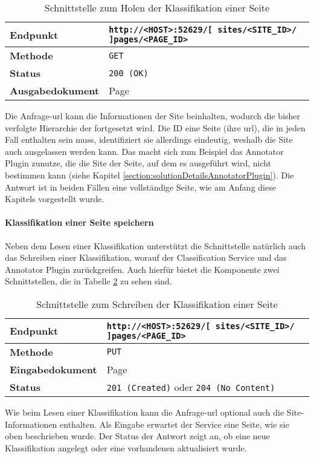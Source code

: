     \begin{table}[htb]
        \centering
        \begin{tabular}{|l|l|}
        \hline
        \textbf{Endpunkt} & \texttt{http://<HOST>:52629/[ sites/<SITE\_ID>/ ]pages/<PAGE\_ID>}\\
        \hline
        \textbf{Methode} & \texttt{GET}\\
        \hline
        \textbf{Status} & \texttt{200 (OK)}\\
        \hline
        \textbf{Ausgabedokument} & Page\\
        \hline
        \end{tabular}
        \caption{Schnittstelle zum Holen der Klassifikation einer Seite}
        \label{table:getFullPageInterface}
    \end{table}

    Die Anfrage-\gls{url} kann die Informationen der Site beinhalten,
    wodurch die bisher verfolgte Hierarchie der {\resources} fortgesetzt wird.
    Die ID eine Seite (ihre \gls{url}), die in jeden Fall enthalten sein muss, identifiziert sie allerdings eindeutig,
    weshalb die Site auch ausgelassen werden kann.
    Das macht sich zum Beispiel das Annotator Plugin zunutze,
    die die Site der Seite, auf dem es ausgeführt wird, nicht bestimmen kann
    (siehe Kapitel \ref{section:solutionDetailsAnnotatorPlugin}).
    Die Antwort ist in beiden Fällen eine vollständige Seite,
    wie am Anfang diese Kapitels vorgestellt wurde.

    \paragraph{Klassifikation einer Seite speichern}
    Neben dem Lesen einer Klassifikation unterstützt die Schnittstelle natürlich auch das Schreiben einer Klassifikation,
    worauf der Classification Service und das Annotator Plugin zurückgreifen.
    Auch hierfür bietet die Komponente zwei Schnittstellen, die in Tabelle \ref{table:writePageInterface} zu sehen sind.

    \begin{table}[htb]
        \centering
        \begin{tabular}{|l|l|}
        \hline
        \textbf{Endpunkt} & \texttt{http://<HOST>:52629/[ sites/<SITE\_ID>/ ]pages/<PAGE\_ID>}\\
        \hline
        \textbf{Methode} & \texttt{PUT}\\
        \hline
        \textbf{Eingabedokument} & Page\\
        \hline
        \textbf{Status} & \texttt{201 (Created)} oder \texttt{204 (No Content)}\\
        \hline
        \end{tabular}
        \caption{Schnittstelle zum Schreiben der Klassifikation einer Seite}
        \label{table:writePageInterface}
    \end{table}

    Wie beim Lesen einer Klassifikation kann die Anfrage-\gls{url} optional auch die Site-Informationen enthalten.
    Als Eingabe erwartet der Service eine Seite, wie sie oben beschrieben wurde.
    Der Status der Antwort zeigt an, ob eine neue Klassifikation angelegt oder eine vorhandenen aktualisiert wurde.
